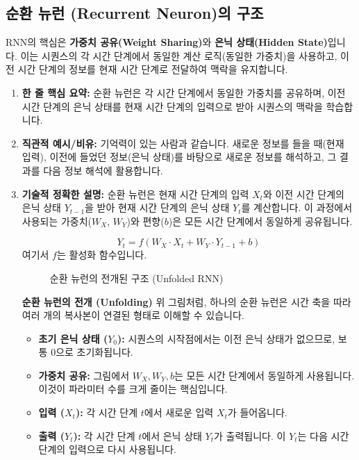 \documentclass[11pt,a4paper]{book}
\theoremstyle{definition}
\begin{document}
\subsection{순환 뉴런 (Recurrent Neuron)의 구조}
RNN의 핵심은 \textbf{가중치 공유(Weight Sharing)}와 \textbf{은닉 상태(Hidden State)}입니다. 이는 시퀀스의 각 시간 단계에서 동일한 계산 로직(동일한 가중치)을 사용하고, 이전 시간 단계의 정보를 현재 시간 단계로 전달하여 맥락을 유지합니다.

\begin{enumerate}
    \item \textbf{한 줄 핵심 요약:} 순환 뉴런은 각 시간 단계에서 동일한 가중치를 공유하며, 이전 시간 단계의 은닉 상태를 현재 시간 단계의 입력으로 받아 시퀀스의 맥락을 학습합니다.
    \item \textbf{직관적 예시/비유:} 기억력이 있는 사람과 같습니다. 새로운 정보를 들을 때(현재 입력), 이전에 들었던 정보(은닉 상태)를 바탕으로 새로운 정보를 해석하고, 그 결과를 다음 정보 해석에 활용합니다.
    \item \textbf{기술적 정확한 설명:}
    순환 뉴런은 현재 시간 단계의 입력 $X_t$와 이전 시간 단계의 은닉 상태 $Y_{t-1}$을 받아 현재 시간 단계의 은닉 상태 $Y_t$를 계산합니다. 이 과정에서 사용되는 가중치($W_X$, $W_Y$)와 편향($b$)은 모든 시간 단계에서 동일하게 공유됩니다.

    \begin{equation*}
    Y_t = f(W_X \cdot X_t + W_Y \cdot Y_{t-1} + b)
    \end{equation*}
    여기서 $f$는 활성화 함수입니다.

    \begin{figure}[h!]
    \centering
    \caption{순환 뉴런의 전개된 구조 (Unfolded RNN)}
    \label{fig:rnn_unfolded}
    \end{figure}

    \textbf{순환 뉴런의 전개 (Unfolding)}
    위 그림처럼, 하나의 순환 뉴런은 시간 축을 따라 여러 개의 복사본이 연결된 형태로 이해할 수 있습니다.
    \begin{itemize}
        \item \textbf{초기 은닉 상태 ($Y_0$):} 시퀀스의 시작점에서는 이전 은닉 상태가 없으므로, 보통 0으로 초기화됩니다.
        \item \textbf{가중치 공유:} 그림에서 $W_X, W_Y, b$는 모든 시간 단계에서 동일하게 사용됩니다. 이것이 파라미터 수를 크게 줄이는 핵심입니다.
        \item \textbf{입력 ($X_t$):} 각 시간 단계 $t$에서 새로운 입력 $X_t$가 들어옵니다.
        \item \textbf{출력 ($Y_t$):} 각 시간 단계 $t$에서 은닉 상태 $Y_t$가 출력됩니다. 이 $Y_t$는 다음 시간 단계의 입력으로 다시 사용됩니다.
    \end{itemize}


\end{enumerate}
\end{document}
